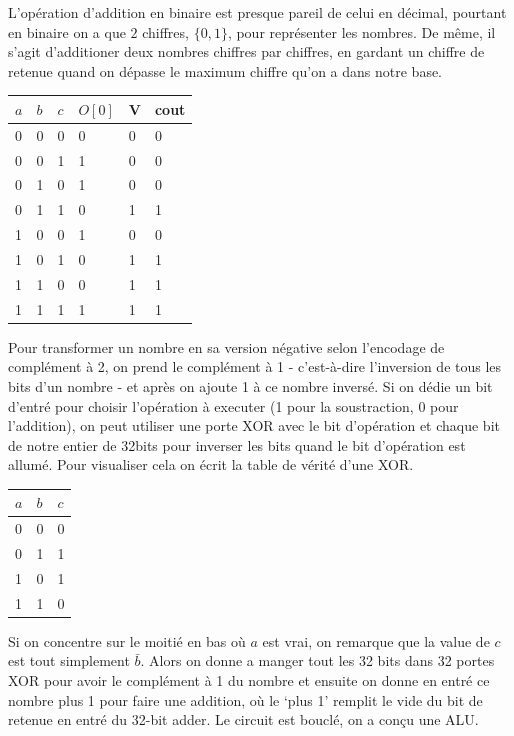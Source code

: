 \documentclass[10pt]{article} %
\begin{document}
    L'opération d'addition en binaire est presque pareil de celui en décimal, pourtant en binaire on a que $2$ chiffres, $\{0, 1\}$, pour représenter les nombres.
    De même, il s'agit d'additioner deux nombres chiffres par chiffres, en gardant un chiffre de retenue quand on dépasse le maximum chiffre qu'on a dans notre base.

    \begin{table}[h!]
        \hspace{1cm}
        \begin{tabular}{lll|l|l|l}
        $a$ & $b$ & $c$ & $O[0]$ & V & cout \\
        \hline
        0 & 0 & 0 & 0        & 0 & 0    \\
        0 & 0 & 1 & 1        & 0 & 0    \\
        0 & 1 & 0 & 1        & 0 & 0    \\
        0 & 1 & 1 & 0        & 1 & 1    \\
        1 & 0 & 0 & 1        & 0 & 0    \\
        1 & 0 & 1 & 0        & 1 & 1    \\
        1 & 1 & 0 & 0        & 1 & 1    \\
        1 & 1 & 1 & 1        & 1 & 1
        \end{tabular}
        \end{table}

Pour transformer un nombre en sa version négative selon l'encodage de complément à 2, on prend le complément à 1 - c'est-à-dire l'inversion de tous les bits d'un nombre - et
après on ajoute 1 à ce nombre inversé. Si on dédie un bit d'entré pour choisir l'opération à executer (1 pour la soustraction, 0 pour l'addition), on peut utiliser une porte
XOR avec le bit d'opération et chaque bit de notre entier de 32bits pour inverser les bits quand le bit d'opération est allumé. Pour visualiser cela on écrit la table de vérité
d'une XOR.

\begin{table}[h!]
    \hspace{1cm}
    \begin{tabular}{ll|l}
    $a$ & $b$ & $c$ \\
    \hline
    0 & 0 & 0 \\
    0 & 1 & 1 \\
    1 & 0 & 1 \\
    1 & 1 & 0
    \end{tabular}
    \end{table}

    Si on concentre sur le moitié en bas où $a$ est vrai, on remarque que la value de $c$ est tout simplement $\bar b$. Alors on donne a manger
    tout les 32 bits dans 32 portes XOR pour avoir le complément à 1 du nombre et ensuite on donne en entré ce nombre plus 1 pour faire une addition, où le `plus 1'
    remplit le vide du bit de retenue en entré du 32-bit adder. Le circuit est bouclé, on a con\c cu une ALU.
\end{document}
